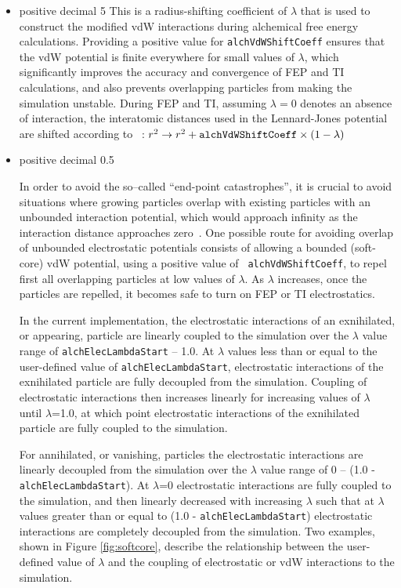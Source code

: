 \begin{itemize}
\item
{}
{positive decimal}
{5} %
{This is a radius-shifting coefficient of $\lambda$ that is used
to construct the modified vdW interactions during alchemical free energy calculations.
Providing a positive value for {\tt alchVdWShiftCoeff} ensures that the vdW potential
is finite everywhere for small values of $\lambda$, which significantly improves the
accuracy and convergence of FEP and TI calculations, and also prevents overlapping particles
from making the simulation unstable. During FEP and TI, assuming $\lambda = 0$
denotes an absence of interaction, the interatomic distances used in
the Lennard-Jones potential are shifted according to ~\cite{Beutler1994,Zacharias1994}:
$r^2 \rightarrow r^2 + {\tt alchVdWShiftCoeff} \times (1 - \lambda)$
}

\item
{}
{positive decimal}
{0.5} %
{In order to avoid the so--called ``end-point catastrophes'', it is crucial to
avoid situations where growing particles overlap with existing particles with
an unbounded interaction potential, which would approach infinity as the
interaction distance approaches zero~\cite{Beutler1994,Chipot2007}. One possible route for
avoiding overlap of unbounded electrostatic potentials consists of allowing a
bounded (soft-core) vdW potential, using a positive value of {\tt
alchVdWShiftCoeff}, to repel first all overlapping particles at low values of
$\lambda$. As $\lambda$ increases, once the particles are repelled, it becomes
safe to turn on FEP or TI electrostatics. 

In the current implementation, the electrostatic interactions of an exnihilated, or appearing, particle are linearly coupled to the simulation over the $\lambda$ value range of {\tt alchElecLambdaStart} -- 1.0. At $\lambda$ values less than or equal to the user-defined value of {\tt alchElecLambdaStart}, electrostatic interactions of the exnihilated particle are fully decoupled from the simulation.  Coupling of electrostatic interactions then increases linearly for increasing values of $\lambda$ until $\lambda$=1.0, at which point electrostatic interactions of the exnihilated particle are fully coupled to the simulation.  

For annihilated, or vanishing, particles the electrostatic interactions are linearly decoupled from the simulation over the $\lambda$ value range of 0 -- (1.0 - {\tt alchElecLambdaStart}). At $\lambda$=0 electrostatic interactions are fully coupled to the simulation, and then linearly decreased with increasing $\lambda$ such that at $\lambda$ values greater than or equal to (1.0 - {\tt alchElecLambdaStart}) electrostatic interactions are completely decoupled from the simulation.  Two examples, shown in Figure \ref{fig:softcore}, describe the relationship between the user-defined value of $\lambda$ and the coupling of electrostatic or vdW interactions to the simulation. }


\end{itemize}
